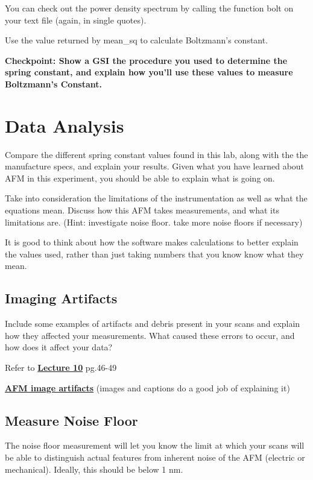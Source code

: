 \documentclass{../lab}
\begin{document}
You can check out the power density spectrum by calling the function bolt on your text file (again, in single quotes).

Use the value returned by mean\_sq to calculate Boltzmann's constant.

\textbf{Checkpoint: Show a GSI the procedure you used to determine the spring constant, and explain how you'll use these values to measure Boltzmann's Constant.}

\section{Data Analysis}

Compare the different spring constant values found in this lab, along with the the manufacture specs, and explain your results.  Given what you have learned about AFM in this experiment, you should be able to explain what is going on.

Take into consideration the limitations of the instrumentation as well as what the equations mean. Discuss how this AFM takes measurements, and what its limitations are. (Hint: investigate noise floor. take more noise floors if necessary)

It is good to think about how the software makes calculations to better explain the values used, rather than just taking numbers that you know know what they mean.

\subsection{Imaging Artifacts}

Include some examples of  artifacts and debris present in your scans and explain how they affected your measurements.  What caused these errors to occur, and how does it affect your data?

Refer to \href{http://experimentationlab.berkeley.edu/sites/default/files/AFMImages/Lecture\_10\_AFM.pdf}{\textbf{Lecture 10}}  pg.46-49

\href{http://experimentationlab.berkeley.edu/sites/default/files/AFMImages/AFM\_image\_artefacts.pdf}{\textbf{AFM image artifacts}} (images and captions do a good job of explaining it)

\subsection{Measure Noise Floor}
\label{subsec:MeasureNoiseFloor}

The noise floor measurement will let you know the limit at which your scans will be able to distinguish actual features from inherent noise of the AFM (electric or mechanical).  Ideally, this should be below 1 nm.
\end{document}
